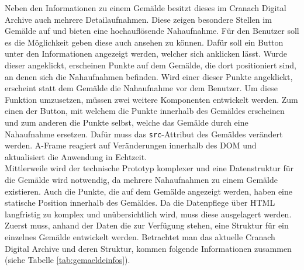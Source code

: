 \documentclass[a4paper,12pt,oneside]{article}
\begin{document}
        Neben den Informationen zu einem Gemälde besitzt dieses im Cranach
        Digital Archive auch mehrere Detailaufnahmen. Diese zeigen besondere
        Stellen im Gemälde auf und bieten eine hochauflösende Nahaufnahme.
        Für den Benutzer soll es die Möglichkeit geben diese auch ansehen zu
        können. Dafür soll ein Button unter den Informationen angezeigt werden,
        welcher sich anklicken lässt. Wurde dieser angeklickt, erscheinen
        Punkte auf dem Gemälde, die dort positioniert sind, an denen sich
        die Nahaufnahmen befinden. Wird einer dieser Punkte angeklickt, 
        erscheint statt dem Gemälde die Nahaufnahme vor dem Benutzer. Um
        diese Funktion umzusetzen, müssen zwei weitere Komponenten entwickelt
        werden. Zum einen der Button, mit welchem die Punkte innerhalb
        des Gemäldes erscheinen und zum anderen die Punkte selbst, welche
        das Gemälde durch eine Nahaufnahme ersetzen. Dafür muss das
        \texttt{src}-Attribut des Gemäldes verändert werden. A-Frame reagiert
        auf Veränderungen innerhalb des DOM und aktualisiert die Anwendung
        in Echtzeit. \\
        Mittlerweile wird der technische Prototyp komplexer und eine
        Datenstruktur für die Gemälde wird notwendig, da mehrere Nahaufnahmen
        zu einem Gemälde existieren. Auch die Punkte, die auf dem Gemälde 
        angezeigt werden, haben eine statische Position innerhalb des 
        Gemäldes. Da die Datenpflege über HTML langfristig zu komplex und
        unübersichtlich wird, muss diese ausgelagert werden.
        Zuerst muss, anhand der Daten die 
        zur Verfügung stehen, eine Struktur für ein einzelnes
        Gemälde entwickelt werden.
        Betrachtet man das aktuelle Cranach Digital Archive und deren Struktur,
        kommen folgende Informationen zusammen (siehe Tabelle \ref{tab:gemaeldeinfos}).        
\end{document}
